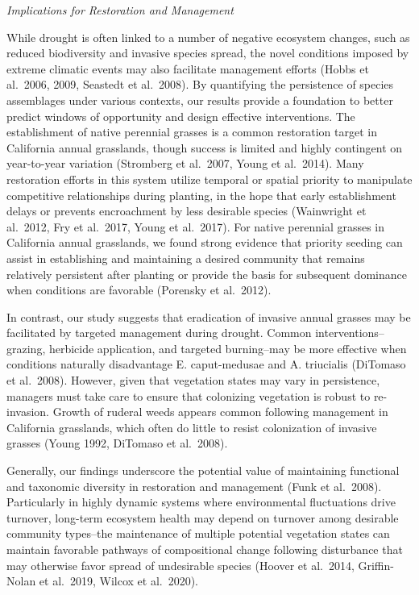 \documentclass[twoside,12pt,final]{ucthesis-CA2012}
\begin{document}
\begin{ucmainmatter}
\emph{Implications for Restoration and Management}

While drought is often linked to a number of negative ecosystem changes, such as reduced biodiversity and invasive species spread, the novel conditions imposed by extreme climatic events may also facilitate management efforts (Hobbs et al.~2006, 2009, Seastedt et al.~2008).
By quantifying the persistence of species assemblages under various contexts, our results provide a foundation to better predict windows of opportunity and design effective interventions.
The establishment of native perennial grasses is a common restoration target in California annual grasslands, though success is limited and highly contingent on year-to-year variation (Stromberg et al.~2007, Young et al.~2014).
Many restoration efforts in this system utilize temporal or spatial priority to manipulate competitive relationships during planting, in the hope that early establishment delays or prevents encroachment by less desirable species (Wainwright et al.~2012, Fry et al.~2017, Young et al.~2017).
For native perennial grasses in California annual grasslands, we found strong evidence that priority seeding can assist in establishing and maintaining a desired community that remains relatively persistent after planting or provide the basis for subsequent dominance when conditions are favorable (Porensky et al.~2012).

In contrast, our study suggests that eradication of invasive annual grasses may be facilitated by targeted management during drought.
Common interventions--grazing, herbicide application, and targeted burning--may be more effective when conditions naturally disadvantage E. caput-medusae and A. triucialis (DiTomaso et al.~2008).
However, given that vegetation states may vary in persistence, managers must take care to ensure that colonizing vegetation is robust to re-invasion.
Growth of ruderal weeds appears common following management in California grasslands, which often do little to resist colonization of invasive grasses (Young 1992, DiTomaso et al.~2008).

Generally, our findings underscore the potential value of maintaining functional and taxonomic diversity in restoration and management (Funk et al.~2008).
Particularly in highly dynamic systems where environmental fluctuations drive turnover, long-term ecosystem health may depend on turnover among desirable community types--the maintenance of multiple potential vegetation states can maintain favorable pathways of compositional change following disturbance that may otherwise favor spread of undesirable species (Hoover et al.~2014, Griffin-Nolan et al.~2019, Wilcox et al.~2020).


\end{ucmainmatter}
\end{document}
